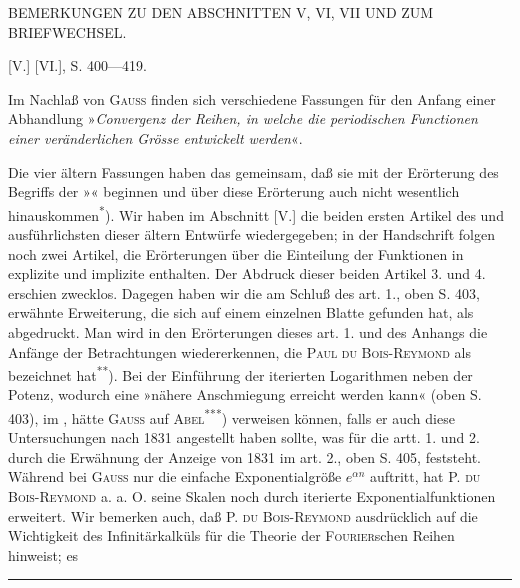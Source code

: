 \par\bigskip
\begingroup\small
\begin{center}BEMERKUNGEN ZU DEN ABSCHNITTEN V, VI, VII UND ZUM BRIEFWECHSEL.\end{center}
\begin{center} [V.]  [VI.], S. 400—419.\end{center}
\indent Im Nachlaß von \textsc{Gauss} finden sich  verschiedene Fassungen für den Anfang einer Abhandlung »\textit{Convergenz der Reihen, in welche die periodischen Functionen einer veränderlichen Grösse entwickelt werden}«.

\indent Die vier ältern Fassungen haben das gemeinsam, daß sie mit der Erörterung des Begriffs der »« beginnen und über diese Erörterung auch nicht wesentlich hinauskommen\textsuperscript{*}). Wir haben im Abschnitt [V.] die beiden ersten Artikel des  und ausführlichsten dieser ältern Entwürfe wiedergegeben; in der Handschrift folgen noch zwei Artikel, die Erörterungen über die Einteilung der Funktionen in explizite und implizite enthalten. Der Abdruck dieser beiden Artikel 3. und 4. erschien zwecklos. Dagegen haben wir die am Schluß des art. 1., oben S. 403, erwähnte Erweiterung, die sich auf einem einzelnen Blatte gefunden hat, als  abgedruckt. Man wird in den Erörterungen dieses art. 1. und des Anhangs die Anfänge der Betrachtungen wiedererkennen, die \textsc{Paul du Bois-Reymond} als \linebreak bezeichnet hat\textsuperscript{**}). Bei der Einführung der iterierten Logarithmen neben der Potenz, wodurch eine »nähere Anschmiegung erreicht werden kann« (oben S. 403), im , hätte \textsc{Gauss} auf \textsc{Abel}\textsuperscript{***}) verweisen können, falls er auch diese Untersuchungen nach 1831 angestellt haben sollte, was für die artt. 1. und 2. durch die Erwähnung der Anzeige von 1831 im art. 2., oben S. 405, feststeht. Während bei \textsc{Gauss} nur die einfache Exponentialgröße \(e^{\alpha n}\) auftritt, hat \textsc{P. du Bois-Reymond} a. a. O. seine Skalen noch durch iterierte Exponentialfunktionen erweitert. Wir bemerken auch, daß \textsc{P. du Bois-Reymond} ausdrücklich auf die Wichtigkeit des Infinitärkalküls für die Theorie der \textsc{Fourier}schen Reihen hinweist; es
\par\medskip\noindent\rule{.24\linewidth}{.4pt}\par\smallskip
